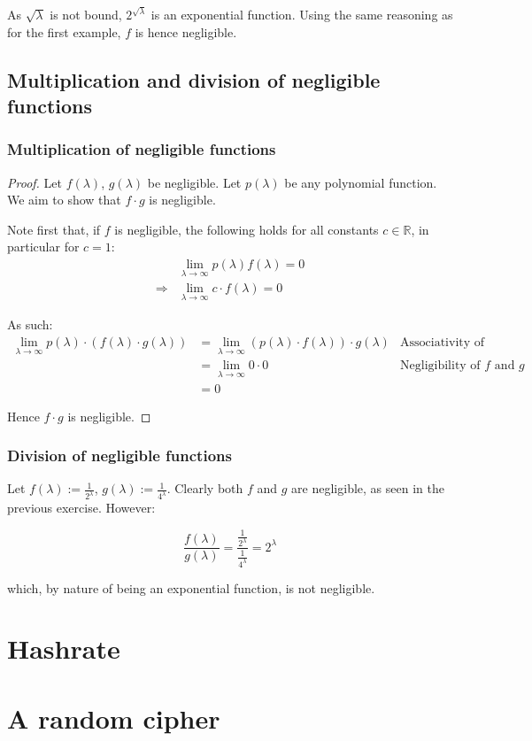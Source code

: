 \documentclass[a4paper]{scrreprt}
\begin{document}
As $\sqrt{\lambda}$ is not bound, $2^{\sqrt{\lambda}}$ is an exponential
function. Using the same reasoning as for the first example, $f$ is hence
negligible.

\subsection{Multiplication and division of negligible functions}

\subsubsection{Multiplication of negligible functions}

\begin{proof}
	Let $f(\lambda)$, $g(\lambda)$ be negligible. Let $p(\lambda)$ be any
	polynomial function. We aim to show that $f \cdot g$ is negligible.

	Note first that, if $f$ is negligible, the following holds for all
	constants $c \in \mathbb{R}$, in particular for $c = 1$:
	\begin{align*}
		& \lim_{\lambda \rightarrow \infty} p(\lambda) f(\lambda) = 0 \\
		\Rightarrow & \lim_{\lambda \rightarrow \infty} c \cdot f(\lambda) = 0
	\end{align*}

	As such:
	\begin{align*}
		\lim_{\lambda \rightarrow \infty} p(\lambda) \cdot (f(\lambda) \cdot g(\lambda)) 
		  & = \lim_{\lambda \rightarrow \infty} (p(\lambda) \cdot f(\lambda)) \cdot g(\lambda) & \text{Associativity of multiplication} \\
		  & = \lim_{\lambda \rightarrow \infty} 0 \cdot 0 & \text{Negligibility of $f$ and $g$} \\
		  & = 0
	\end{align*}

	Hence $f \cdot g$ is negligible.
\end{proof}

\subsubsection{Division of negligible functions}

Let $f(\lambda) := \frac{1}{2^\lambda}$, $g(\lambda) := \frac{1}{4^\lambda}$.
Clearly both $f$ and $g$ are negligible, as seen in the previous exercise.
However:

\[
	\frac{f(\lambda)}{g(\lambda)} = \frac{\frac{1}{2^\lambda}}{\frac{1}{4^\lambda}} = 2^\lambda
\]

which, by nature of being an exponential function, is not negligible.

\section{Hashrate}

\section{A random cipher}
\end{document}
